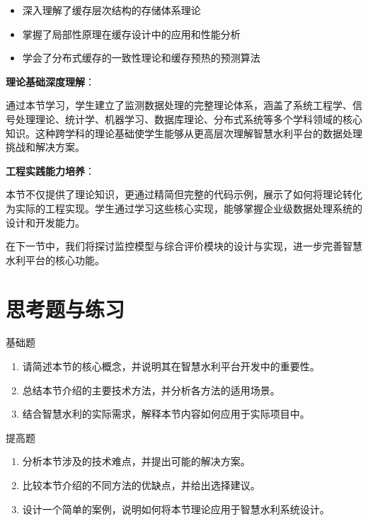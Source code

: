 \begin{enumerate}
  \begin{itemize}
  \tightlist
  \item
    深入理解了缓存层次结构的存储体系理论
  \item
    掌握了局部性原理在缓存设计中的应用和性能分析
  \item
    学会了分布式缓存的一致性理论和缓存预热的预测算法
  \end{itemize}
\end{enumerate}

\textbf{理论基础深度理解}：

通过本节学习，学生建立了监测数据处理的完整理论体系，涵盖了系统工程学、信号处理理论、统计学、机器学习、数据库理论、分布式系统等多个学科领域的核心知识。这种跨学科的理论基础使学生能够从更高层次理解智慧水利平台的数据处理挑战和解决方案。

\textbf{工程实践能力培养}：

本节不仅提供了理论知识，更通过精简但完整的代码示例，展示了如何将理论转化为实际的工程实现。学生通过学习这些核心实现，能够掌握企业级数据处理系统的设计和开发能力。

在下一节中，我们将探讨监控模型与综合评价模块的设计与实现，进一步完善智慧水利平台的核心功能。

\section{思考题与练习}

 基础题

\begin{enumerate}
\def\labelenumi{\arabic{enumi}.}
\tightlist
\item
  请简述本节的核心概念，并说明其在智慧水利平台开发中的重要性。
\item
  总结本节介绍的主要技术方法，并分析各方法的适用场景。
\item
  结合智慧水利的实际需求，解释本节内容如何应用于实际项目中。
\end{enumerate}

 提高题

\begin{enumerate}
\def\labelenumi{\arabic{enumi}.}
\setcounter{enumi}{3}
\tightlist
\item
  分析本节涉及的技术难点，并提出可能的解决方案。
\item
  比较本节介绍的不同方法的优缺点，并给出选择建议。
\item
  设计一个简单的案例，说明如何将本节理论应用于智慧水利系统设计。
\end{enumerate}

